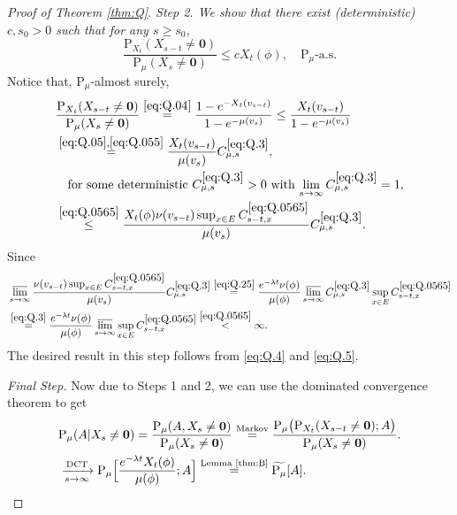 \documentclass[12pt,a4paper]{amsart}
\numberwithin{equation}{section}
\theoremstyle{plain}
\theoremstyle{definition}
\theoremstyle{remark}
\begin{document}
\begin{proof}[Proof of Theorem \ref{thm:Q}]
\emph{
	Step 2. We show that there exist (deterministic) $c,s_0>0$ such that for any $s\geq s_0$,
	\begin{equation} \label{eq:Q.2}
		\frac{\mathrm P_{X_t}(X_{s-t} \neq \mathbf 0)}{\mathrm P_\mu(X_{s} \neq \mathbf 0)}
		\leq cX_t(\phi), \quad \mathrm P_\mu\text{-a.s.}
	\end{equation}
}
	Notice that, $\mathrm P_\mu$-almost surely,
	\begin{align}
		& \frac{\mathrm P_{X_t}(X_{s-t}\neq \mathbf 0)}{\mathrm P_\mu(X_s\neq \mathbf 0)}
		\overset{\eqref{eq:Q.04}}= \frac{1-e^{- X_t(v_{s-t}) }}{1-e^{- \mu(v_s) }}
		\leq \frac{X_t(v_{s-t}) }{1-e^{- \mu(v_s) }}
		\\\label{eq:Q.3}&\overset{\eqref{eq:Q.05},\eqref{eq:Q.055}}= \frac{X_t(v_{s-t}) }{ \mu(v_s)} C_{\mu ,s}^{\eqref{eq:Q.3}},
		\\& \quad \text{for some deterministic $C_{\mu ,s}^{\eqref{eq:Q.3}}>0$ with $\lim_{s\to \infty} C_{\mu,s}^{\eqref{eq:Q.3}} = 1$,}
		\\\label{eq:Q.4}&\overset{\eqref{eq:Q.0565}}\leq \frac{X_t(\phi) \nu(v_{s-t}) \sup_{x\in E} C_{s-t,x}^{\eqref{eq:Q.0565}}}{ \mu(v_s)} C_{\mu,s}^{\eqref{eq:Q.3}}.
	\end{align}
	Since
	\begin{align}
		&  \varlimsup_{s\to \infty}\frac{\nu(v_{s-t}) \sup_{x\in E} C_{s-t,x}^{\eqref{eq:Q.0565}}}{ \mu(v_s)} C_{\mu ,s}^{\eqref{eq:Q.3}}
		\overset{\eqref{eq:Q.25}} = \frac{e^{-\lambda t} \nu(\phi)}{\mu(\phi)} \varlimsup_{s\to \infty}C_{\mu ,s}^{\eqref{eq:Q.3}} \sup_{x\in E}C_{s-t,x}^{\eqref{eq:Q.0565}}
		\\\label{eq:Q.5}&\overset{\eqref{eq:Q.3}} = \frac{e^{-\lambda t} \nu(\phi)}{\mu(\phi)} \varlimsup_{s\to \infty} \sup_{x\in E}C_{s-t,x}^{\eqref{eq:Q.0565}}
		\overset{\eqref{eq:Q.0565}}< \infty.
	\end{align}
	The desired result in this step follows from \eqref{eq:Q.4} and \eqref{eq:Q.5}.
	
	\emph{Final Step.} Now due to Steps 1 and 2, we can use the dominated convergence theorem to get
\begin{align}
&  \mathrm P_\mu(A|X_s\neq \mathbf 0)
	=\frac{\mathrm P_\mu(A, X_s \neq \mathbf 0)}{\mathrm P_\mu(X_s\neq \mathbf 0)}
	\overset{\text{Markov}}=\frac{\mathrm P_\mu\big(\mathrm P_{X_t}(X_{s-t} \neq \mathbf 0);A\big)}{\mathrm P_\mu(X_s\neq \mathbf 0)}.
	\\&\xrightarrow[s\to \infty]{\text{DCT}} \mathrm P_\mu\Big[\frac{e^{-\lambda t}X_t(\phi)}{\mu(\phi) }; A\Big]
	\overset{\text{Lemma \ref{thm:B}}} = \widetilde{\mathrm P_\mu}[A].
	\qedhere
\end{align}
\end{proof}
\end{document}
